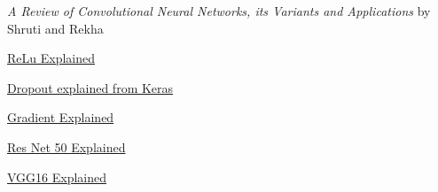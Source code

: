 \documentclass[a4paper,10pt]{article}
\begin{document}
\begin{thebibliography}{}
     \emph{A Review of Convolutional Neural Networks, its Variants and Applications} by Shruti and Rekha

     \href{https://www.kaggle.com/code/dansbecker/rectified-linear-units-relu-in-deep-learning}{ReLu Explained}
    
     \href{https://keras.io/api/layers/regularization_layers/dropout/#:~:text=The%20Dropout%20layer%20randomly%20sets,over%20all%20inputs%20is%20unchanged}{Dropout explained from Keras}

     \href{https://machinelearningmastery.com/gradient-in-machine-learning/}{Gradient Explained}

     \href{https://viso.ai/deep-learning/resnet-residual-neural-network/}{Res Net 50 Explained}

     \href{https://www.kaggle.com/code/blurredmachine/vggnet-16-architecture-a-complete-guide}{VGG16 Explained}    

  \end{thebibliography}
\end{document}
